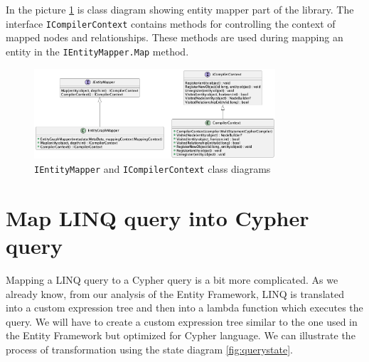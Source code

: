 In the picture \ref{fig:IEntityMapperClassDiagram} is class diagram showing entity mapper part of the library.
The interface \texttt{ICompilerContext} contains methods for controlling the context of mapped nodes and relationships.
These methods are used during mapping an entity in the \texttt{IEntityMapper.Map} method.

\begin{figure}[H]
    \centering
    \includegraphics[width=0.8\textwidth]{content/entitymapper.png}
    \caption{\texttt{IEntityMapper} and \texttt{ICompilerContext} class diagrams}
    \label{fig:IEntityMapperClassDiagram}
\end{figure}

\section {Map LINQ query into Cypher query}

Mapping a LINQ query to a Cypher query is a bit more complicated.
As we already know, from our analysis of the Entity Framework, LINQ is translated into a custom expression tree and then into a lambda function which executes the query.
We will have to create a custom expression tree similar to the one used in the Entity Framework but optimized for Cypher language.
We can illustrate the process of transformation using the state diagram
\ref{fig:querystate}.

